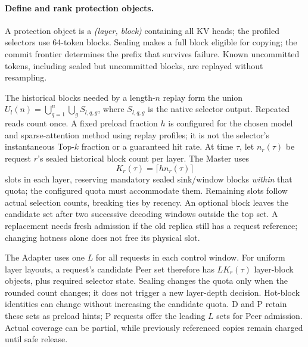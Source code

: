 \paragraph{Define and rank protection objects.}
A protection object is a \emph{(layer, block)} containing all KV heads;
the profiled selectors use 64-token blocks. Sealing makes a full block
eligible for copying; the commit frontier determines the prefix that
survives failure. Known uncommitted tokens, including sealed but
uncommitted blocks, are replayed without resampling.

The historical blocks needed by a length-$n$ replay form the union
$U_l(n)=\bigcup_{q=1}^{n}\bigcup_g S_{l,q,g}$, where $S_{l,q,g}$ is the
native selector output. Repeated reads count once. A fixed preload
fraction $h$ is configured for the chosen model and sparse-attention
method using replay profiles; it is not the selector's instantaneous
Top-$k$ fraction or a guaranteed hit rate. At time $\tau$, let $n_r(\tau)$
be request $r$'s sealed historical block count per layer. The Master uses
\begin{equation}
 K_r(\tau)=\lceil h n_r(\tau)\rceil
 \label{eq:hot-block-count}
\end{equation}
slots in each layer, reserving mandatory sealed sink/window blocks
\emph{within} that quota; the configured quota must accommodate them.
Remaining slots follow actual selection counts, breaking ties by recency.
An optional block leaves the candidate set after two successive decoding
windows outside the top set. A replacement needs fresh admission if
the old replica still has a request reference; changing hotness alone
does not free its physical slot.

The Adapter uses one $L$ for all requests in each control window. For
uniform layer layouts, a request's candidate Peer set therefore has
$LK_r(\tau)$ layer-block objects, plus required selector state.
Sealing changes the quota only when the rounded count changes; it does
not trigger a new layer-depth decision. Hot-block identities can change
without increasing the candidate quota. D and P retain these sets as
preload hints; P requests offer the leading $L$ sets for Peer admission.
Actual coverage can be partial, while previously referenced copies
remain charged until safe release.

